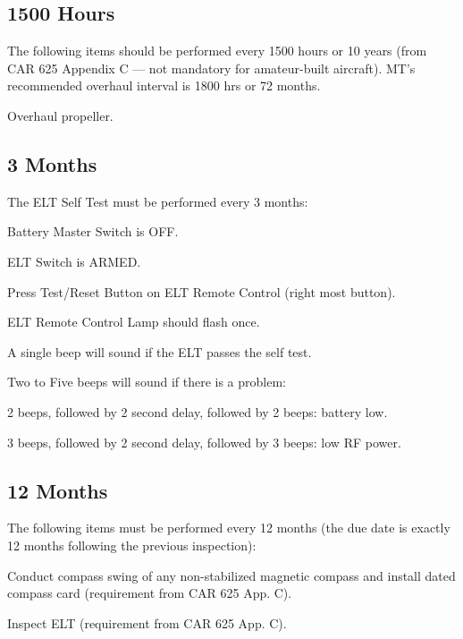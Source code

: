 \subsection{1500 Hours} The following items should be performed every 1500 hours or 10 years (from CAR 625 Appendix C --- not mandatory for amateur-built aircraft). MT's recommended overhaul interval is 1800 hrs or 72 months.
\begin{enumerate*}
	\item Overhaul propeller. 
\end{enumerate*}

\subsection{3 Months} The ELT Self Test must be performed every 3 months:
\begin{enumerate*}
	\item Battery Master Switch is OFF.
	\item ELT Switch is ARMED.
	\item Press Test/Reset Button on ELT Remote Control (right most button).
	\item ELT Remote Control Lamp should flash once.
	\item A single beep will sound if the ELT passes the self test.
	\item Two to Five beeps will sound if there is a problem:
	\begin{enumerate*}
	  \item 2 beeps, followed by 2 second delay, followed by 2 beeps: battery low.
	  \item 3 beeps, followed by 2 second delay, followed by 3 beeps: low RF power.
	  \end{enumerate*}
\end{enumerate*}

\subsection{12 Months} The following items must be performed every 12 months (the due date is exactly 12 months following the previous inspection):
\begin{enumerate*}
	\item Conduct compass swing of any non-stabilized magnetic compass and install dated compass card (requirement from CAR 625 App. C).
	\item Inspect ELT (requirement from CAR 625 App. C).
\end{enumerate*}

